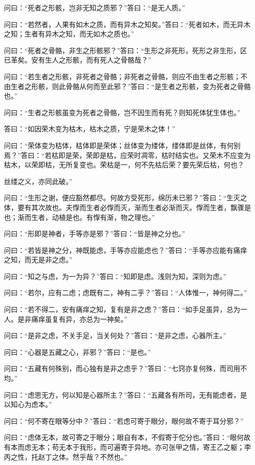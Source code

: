 \documentclass[12pt,UTF8]{ctexbook}
\begin{document}
问曰：“死者之形骸，岂非无知之质邪？”答曰：“是无人质。”

问曰：“若然者，人果有如木之质，而有异木之知矣。”答曰：“死者如木，而无异木之知；生者有异木之知，而无如木之质也。”

问曰：“死者之骨骼，非生之形骸邪？”答曰：“生形之非死形，死形之非生形，区已革矣。安有生人之形骸，而有死人之骨骼哉？”

问曰：“若生者之形骸，非死者之骨骼；非死者之骨骼，则应不由生者之形骸；不由生者之形骸，则此骨骼从何而至此邪？”答曰：“是生者之形骸，变为死者之骨骼也。”

问曰：“生者之形骸虽变为死者之骨骼，岂不因生而有死？则知死体犹生体也。”

答曰：“如因荣木变为枯木，枯木之质，宁是荣木之体！”

问曰：“荣体变为枯体，枯体即是荣体；丝体变为缕体，缕体即是丝体，有何别焉？”答曰：“若枯即是荣，荣即是枯，应荣时凋零，枯时结实也。又荣木不应变为枯木，以荣即枯，无所复变也。荣枯是一，何不先枯后荣？要先荣后枯，何也？

丝缕之义，亦同此破。”

问曰：“生形之谢，便应豁然都尽。何故方受死形，绵历未已邪？”答曰：“生灭之体，要有其次故也。夫惸而生者必惸而灭，渐而生者必渐而灭。惸而生者，飘骤是也；渐而生者，动植是也。有惸有渐，物之理也。”

问曰：“形即是神者，手等亦是邪？”答曰：“皆是神之分也。”

问曰：“若皆是神之分，神既能虑，手等亦应能虑也？”答曰：“手等亦应能有痛痒之知，而无是非之虑。”

问曰：“知之与虑，为一为异？”答曰：“知即是虑。浅则为知，深则为虑。”

问曰：“若尔，应有二虑；虑既有二，神有二乎？”答曰：“人体惟一，神何得二。”

问曰：“若不得二，安有痛痒之知，复有是非之虑？”答曰：“如手足虽异，总为一人。是非痛痒虽复有异，亦总为一神矣。”

问曰：“是非之虑，不关手足，当关何处？”答曰：“是非之虑，心器所主。”

问曰：“心器是五藏之心，非邪？”答曰：“是也。”

问曰：“五藏有何殊别，而心独有是非之虑乎？”答曰：“七窍亦复何殊，而司用不均。”

问曰：“虑思无方，何以知是心器所主？”答曰：“五藏各有所司，无有能虑者，是以知心为虑本。”

问曰：“何不寄在眼等分中？”答曰：“若虑可寄于眼分，眼何故不寄于耳分邪？”

问曰：“虑体无本，故可寄之于眼分；眼自有本，不假寄于佗分也。”答曰：“眼何故有本而虑无本；苟无本于我形，而可遍寄于异地。亦可张甲之情，寄王乙之躯；李丙之性，托赵丁之体。然乎哉？不然也。”
\end{document}

